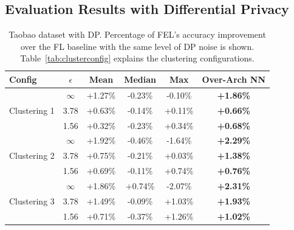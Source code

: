 \documentclass{article}
\begin{document}
\subsection{Evaluation Results with Differential Privacy}
\vspace{-0.25cm}
\label{sec:privacy-eval}

\begin{table}
\centering
\caption{\label{tab:FEAdsResultsDP} Taobao dataset with DP. Percentage of FEL's accuracy improvement over the FL baseline with the same level of DP noise is shown. Table~\ref{tab:clusterconfig} explains the clustering configurations.}
\begin{tabular}{|lc|cccc|}
\hline
Config & $\epsilon$ & Mean & Median & Max & Over-Arch NN  \\ \hline\hline
\multirow{3}{*}{Clustering 1} & $\infty$ & +1.27\% & -0.23\% & -0.10\% & \textbf{+1.86\%} \\
 & 3.78 & +0.63\% & -0.14\% & +0.11\% & \textbf{+0.66\%} \\
 & 1.56 & +0.32\% & -0.23\% & +0.34\% & \textbf{+0.68\%} \\ \hline

\multirow{3}{*}{Clustering 2} & $\infty$ & +1.92\% & -0.46\% & -1.64\% & \textbf{+2.29\%} \\
 & 3.78 & +0.75\% & -0.21\% & +0.03\% & \textbf{+1.38\%} \\
 & 1.56 & +0.69\% & -0.11\% & +0.74\% & \textbf{+0.76\%} \\ \hline

\multirow{3}{*}{Clustering 3} & $\infty$ & +1.86\% & +0.74\% & -2.07\% & \textbf{+2.31\%} \\
 & 3.78 & +1.49\% & -0.09\% & +1.03\% & \textbf{+1.93\%} \\
 & 1.56 & +0.71\% & -0.37\% & +1.26\% & \textbf{+1.02\%} \\ \hline

\end{tabular}\\
\vspace{-0.25cm}
\end{table}
\end{document}
